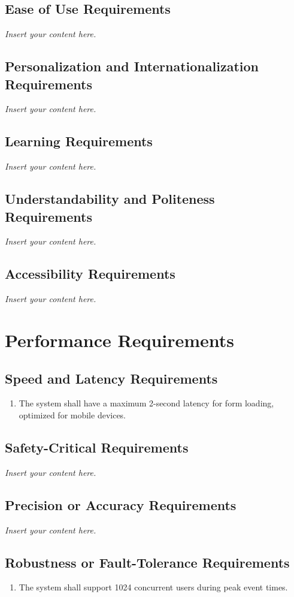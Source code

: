 \documentclass[12pt]{article}
\newcommand{\lips}{\textit{Insert your content here.}}
\begin{document}
\subsection{Ease of Use Requirements}
\lips
\subsection{Personalization and Internationalization Requirements}
\lips
\subsection{Learning Requirements}
\lips
\subsection{Understandability and Politeness Requirements}
\lips
\subsection{Accessibility Requirements}
\lips

\section{Performance Requirements}
\subsection{Speed and Latency Requirements}
\begin{enumerate}[align=left,
  leftmargin=*,
  labelsep=1em,
  labelwidth=4em,
  itemindent=0em,
  label=\bfseries SL-\arabic*:]
  \item The system shall have a maximum 2-second latency for form loading, optimized for
    mobile devices.
\end{enumerate}
\subsection{Safety-Critical Requirements}
\lips
\subsection{Precision or Accuracy Requirements}
\lips
\subsection{Robustness or Fault-Tolerance Requirements}
\begin{enumerate}[align=left,
  leftmargin=*,
  labelsep=1em,
  labelwidth=4em,
  itemindent=0em,
  label=\bfseries RF-\arabic*:]
  \item The system shall support 1024 concurrent users during peak event times.
\end{enumerate}
\end{document}
